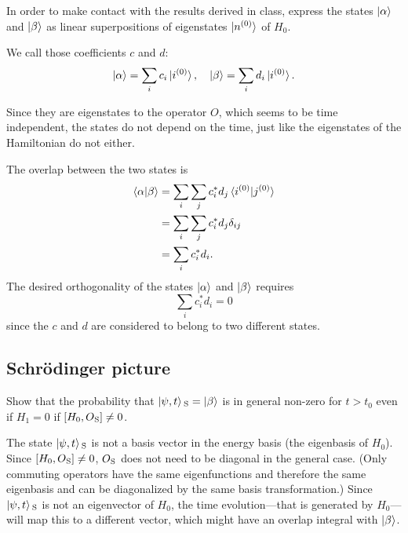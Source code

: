 \documentclass[11pt, english, fleqn, DIV=15, headinclude, BCOR=1.5cm]{scrartcl}
\begin{document}
\begin{problem}
    In order to make contact with the results derived in class, express the
    states $\ket\alpha$ and $\ket\beta$ as linear superpositions of eigenstates
    $\ket{n{}^{(0)}}$ of $H_0$.
\end{problem}

We call those coefficients $c$ and $d$:
\[
    \ket\alpha = \sum_i c_i \ket{i{}^{(0)}}
    ,\quad
    \ket\beta = \sum_i d_i \ket{i{}^{(0)}}.
\]

Since they are eigenstates to the operator $O$, which seems to be time
independent, the states do not depend on the time, just like the eigenstates of
the Hamiltonian do not either.

The overlap between the two states is
\begin{align*}
    \braket{\alpha|\beta}
    &= \sum_i \sum_j c_i^* d_j \braket{i{}^{(0)} | j{}^{(0)}} \\
    &= \sum_i \sum_j c_i^* d_j \delta_{ij} \\
    &= \sum_i c_i^* d_i.
\end{align*}
The desired orthogonality of the states $\ket\alpha$ and $\ket\beta$ requires
\[
    \sum_i c_i^* d_i = 0
\]
since the $c$ and $d$ are considered to belong to two different states.

\subsection{Schrödinger picture}

\begin{problem}
    Show that the probability that $\ket{\psi, t}{}_\text S = \ket\beta$ is in general
    non-zero for $t > t_0$ even if $H_1 = 0$ if $[H_0, O{}_\text S] \neq 0$.
\end{problem}

The state $\ket{\psi, t}{}_\text S$ is not a basis vector in the energy basis (the
eigenbasis of $H_0$). Since $[H_0, O{}_\text S] \neq 0$, $O{}_\text S$ does not need to be
diagonal in the general case. (Only commuting operators have the same
eigenfunctions and therefore the same eigenbasis and can be diagonalized by the
same basis transformation.) Since $\ket{\psi, t}{}_\text S$ is not an eigenvector of
$H_0$, the time evolution---that is generated by $H_0$---will map
this to a different vector, which might have an overlap integral with
$\ket\beta$.
\end{document}
